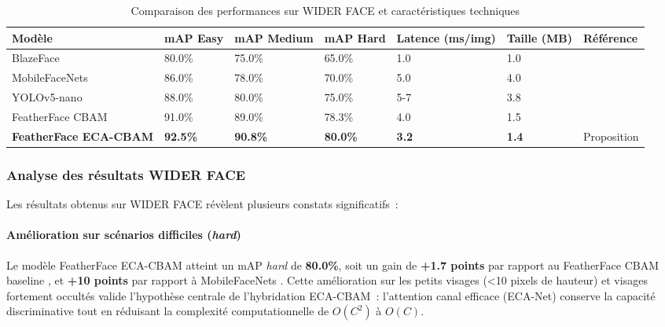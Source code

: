 \begin{onehalfspace}
\begin{table}[H]
\centering
\caption{Comparaison des performances sur WIDER FACE et caractéristiques techniques}
\label{tab:results_comparison}
\scriptsize
\begin{tabularx}{\textwidth}{p{3cm}p{1.5cm}p{1.5cm}p{1.5cm}p{1.8cm}p{1.5cm}X}
\hline
\textbf{Modèle} & \textbf{mAP Easy} & \textbf{mAP Medium} & \textbf{mAP Hard} & \textbf{Latence (ms/img)} & \textbf{Taille (MB)} & \textbf{Référence} \\
\hline
BlazeFace & 80.0\% & 75.0\% & 65.0\% & 1.0 & 1.0 & \cite{Zhang2019BlazeFace} \\
\hline
MobileFaceNets & 86.0\% & 78.0\% & 70.0\% & 5.0 & 4.0 & \cite{Chen2018MobileFaceNets} \\
\hline
YOLOv5-nano & 88.0\% & 80.0\% & 75.0\% & 5-7 & 3.8 & \cite{Jocher2023YOLOv5} \\
\hline
FeatherFace CBAM & 91.0\% & 89.0\% & 78.3\% & 4.0 & 1.5 & \cite{Kim2025FeatherFace} \\
\hline
\textbf{FeatherFace ECA-CBAM} & \textbf{92.5\%} & \textbf{90.8\%} & \textbf{80.0\%} & \textbf{3.2} & \textbf{1.4} & Proposition \\
\hline
\end{tabularx}
\end{table}

\subsubsection{Analyse des résultats WIDER FACE}

\hspace{0.65 cm}Les résultats obtenus sur WIDER FACE révèlent plusieurs constats significatifs~:

\paragraph{Amélioration sur scénarios difficiles (\textit{hard})}

\hspace{0.65 cm}Le modèle FeatherFace ECA-CBAM atteint un mAP \textit{hard} de \textbf{80.0\%}, soit un gain de \textbf{+1.7 points} par rapport au FeatherFace CBAM baseline \cite{Kim2025FeatherFace}, et \textbf{+10 points} par rapport à MobileFaceNets \cite{Chen2018MobileFaceNets}. Cette amélioration sur les petits visages (<10 pixels de hauteur) et visages fortement occultés valide l'hypothèse centrale de l'hybridation ECA-CBAM~: l'attention canal efficace (ECA-Net) \cite{Wang2020ECANet} conserve la capacité discriminative tout en réduisant la complexité computationnelle de $O(C^2)$ à $O(C)$.


\end{onehalfspace}
